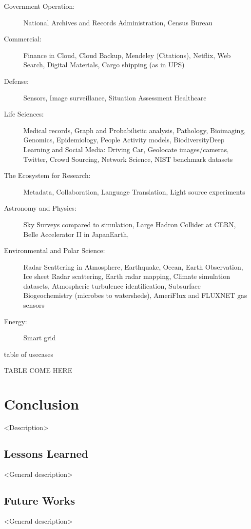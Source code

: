 \begin{description}

\item[Government Operation:] National Archives and Records
  Administration, Census Bureau

\item[Commercial:] Finance in Cloud, Cloud Backup, Mendeley
  (Citations), Netflix, Web Search, Digital Materials, Cargo shipping
  (as in UPS)

\item[Defense:] Sensors, Image surveillance, Situation Assessment
  Healthcare

\item[Life Sciences:] Medical records, Graph and Probabilistic
  analysis, Pathology, Bioimaging, Genomics, Epidemiology, People
  Activity models, BiodiversityDeep Learning and Social Media: Driving
  Car, Geolocate images/cameras, Twitter, Crowd Sourcing, Network
  Science, NIST benchmark datasets

\item[The Ecosystem for Research:] Metadata, Collaboration, Language
  Translation, Light source experiments

\item[Astronomy and Physics:] Sky Surveys compared to simulation,
  Large Hadron Collider at CERN, Belle Accelerator II in JapanEarth,

\item[Environmental and Polar Science:] Radar Scattering in
  Atmosphere, Earthquake, Ocean, Earth Observation, Ice sheet Radar
  scattering, Earth radar mapping, Climate simulation datasets,
  Atmospheric turbulence identification, Subsurface Biogeochemistry
  (microbes to watersheds), AmeriFlux and FLUXNET gas sensors

\item[Energy:] Smart grid

\end{description}

\begin{table*}[htb]

\caption{table of usecases}
\label{T:usecases}

TABLE COME HERE

\end{table*}


\section{Conclusion}

<Description> 

\subsection{Lessons Learned}

<General description>

\subsection{Future Works}


<General description>



